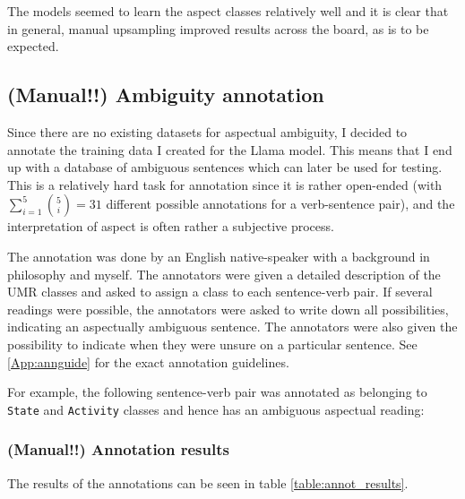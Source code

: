 The models seemed to learn the aspect classes relatively well and it is clear that in general, manual upsampling improved results across the board, as is to be expected.

\subsection{(Manual!!) Ambiguity annotation}
Since there are no existing datasets for aspectual ambiguity, I decided to annotate the training data I created for the Llama model. This means that I end up with a database of ambiguous sentences which can later be used for testing. This is a relatively hard task for annotation since it is rather open-ended (with $\sum_{i=1}^{5} \binom{5}{i}=31$ different possible annotations for a verb-sentence pair), and the interpretation of aspect is often rather a subjective process.

The annotation was done by an English native-speaker with a background in philosophy and myself. The annotators were given a detailed description of the UMR classes and asked to assign a class to each sentence-verb pair. If several readings were possible, the annotators were asked to write down all possibilities, indicating an aspectually ambiguous sentence. The annotators were also given the possibility to indicate when they were unsure on a particular sentence. See \ref{App:annguide} for the exact annotation guidelines.

For example, the following sentence-verb pair was annotated as belonging to \texttt{State} and \texttt{Activity} classes and hence has an ambiguous aspectual reading:

\begin{exe}
\end{exe}
\label{ambigExampleSent}

\subsubsection{(Manual!!) Annotation results}

The results of the annotations can be seen in table \ref{table:annot_results}.

